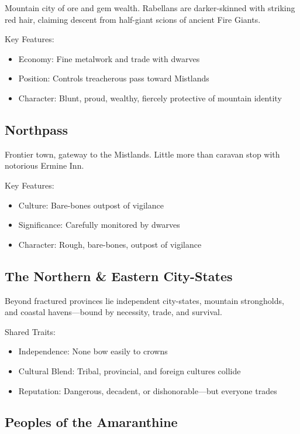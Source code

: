 Mountain city of ore and gem wealth. Rabellans are darker-skinned with striking red hair, claiming descent from half-giant scions of ancient Fire Giants.

Key Features:
\begin{itemize}
    \item Economy: Fine metalwork and trade with dwarves
    \item Position: Controls treacherous pass toward Mistlands
    \item Character: Blunt, proud, wealthy, fiercely protective of mountain identity
\end{itemize}

\subsection{Northpass}
\label{sec:northpass}

Frontier town, gateway to the Mistlands. Little more than caravan stop with notorious Ermine Inn.

Key Features:
\begin{itemize}
    \item Culture: Bare-bones outpost of vigilance
    \item Significance: Carefully monitored by dwarves
    \item Character: Rough, bare-bones, outpost of vigilance
\end{itemize}

\subsection{The Northern \& Eastern City-States}
\label{sec:citystates}

Beyond fractured provinces lie independent city-states, mountain strongholds, and coastal havens---bound by necessity, trade, and survival.

Shared Traits:
\begin{itemize}
    \item Independence: None bow easily to crowns
    \item Cultural Blend: Tribal, provincial, and foreign cultures collide
    \item Reputation: Dangerous, decadent, or dishonorable---but everyone trades
\end{itemize}

\subsection{Peoples of the Amaranthine}

